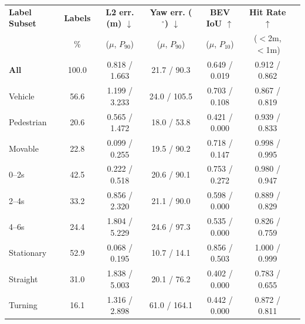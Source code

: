 \begin{tabular}{lcccccc}
\toprule
\textbf{Label Subset} & \textbf{Labels} & \textbf{L2 err. (m) $\downarrow$} & \textbf{Yaw err. ($^\circ$) $\downarrow$} & \textbf{BEV IoU $\uparrow$} & \textbf{Hit Rate $\uparrow$} \\
 & \% & ($\mu$, $P_{90}$) & ($\mu$, $P_{90}$) & ($\mu$, $P_{10}$) & ($<$2m, $<$1m) \\
\midrule \midrule
\textbf{All} & 100.0 & 0.818 / 1.663 & 21.7 / 90.3 & 0.649 / 0.019 & 0.912 / 0.862 \\
\midrule
Vehicle & 56.6 & 1.199 / 3.233 & 24.0 / 105.5 & 0.703 / 0.108 & 0.867 / 0.819 \\
Pedestrian & 20.6 & 0.565 / 1.472 & 18.0 / 53.8 & 0.421 / 0.000 & 0.939 / 0.833 \\
Movable & 22.8 & 0.099 / 0.255 & 19.5 / 90.2 & 0.718 / 0.147 & 0.998 / 0.995 \\
\midrule
0--2s & 42.5 & 0.222 / 0.518 & 20.6 / 90.1 & 0.753 / 0.272 & 0.980 / 0.947 \\
2--4s & 33.2 & 0.856 / 2.320 & 21.1 / 90.0 & 0.598 / 0.000 & 0.889 / 0.829 \\
4--6s & 24.4 & 1.804 / 5.229 & 24.6 / 97.3 & 0.535 / 0.000 & 0.826 / 0.759 \\
\midrule
Stationary & 52.9 & 0.068 / 0.195 & 10.7 / 14.1 & 0.856 / 0.503 & 1.000 / 0.999 \\
Straight & 31.0 & 1.838 / 5.003 & 20.1 / 76.2 & 0.402 / 0.000 & 0.783 / 0.655 \\
Turning & 16.1 & 1.316 / 2.898 & 61.0 / 164.1 & 0.442 / 0.000 & 0.872 / 0.811 \\
\bottomrule
\end{tabular}
